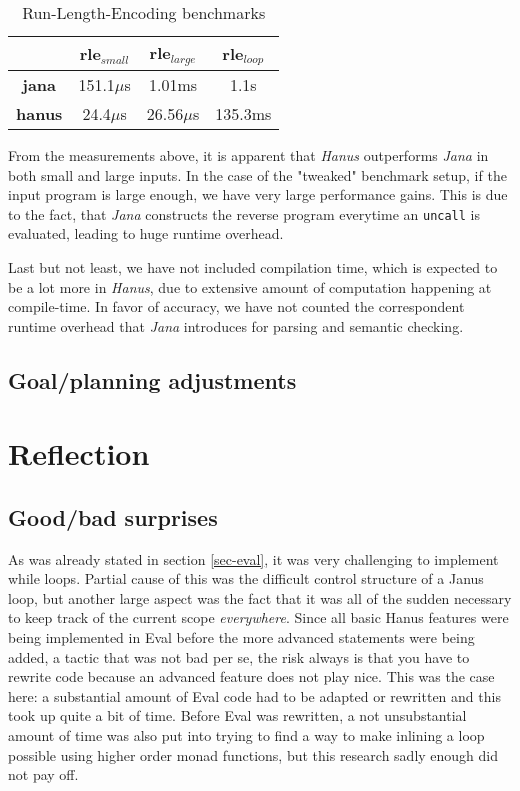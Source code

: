 \documentclass[12pt,a4paper]{article}
\newcommand{\inlinecode}[1]{\texttt{#1}}
\begin{document}
\begin{table}[h!]
\centering
\begin{tabular}{|c | c | c | c|}
\hline
& rle$_{small}$ & rle$_{large}$ & rle$_{loop}$ \\
\hline
\textbf{jana} & 151.1$\mu$s & 1.01ms & 1.1s \\
\textbf{hanus} & 24.4$\mu$s & 26.56$\mu$s & 135.3ms\\
\hline
\end{tabular}
\caption{Run-Length-Encoding benchmarks}
\end{table}

From the measurements above, it is apparent that \textit{Hanus} outperforms \textit{Jana} in both small and large inputs. In the case of the "tweaked" benchmark setup, if the input program is large enough, we have very large performance gains. This is due to the fact, that \textit{Jana} constructs the reverse program everytime an \inlinecode{uncall} is evaluated, leading to huge runtime overhead.

Last but not least, we have not included compilation time, which is expected to be a lot more in \textit{Hanus}, due to extensive amount of computation happening at compile-time. In favor of accuracy, we have not counted the correspondent runtime overhead that \textit{Jana} introduces for parsing and semantic checking.

    \subsection{Goal/planning adjustments}
\section{Reflection}
    \subsection{Good/bad surprises}
                As was already stated in section \ref{sec-eval}, it was very challenging to implement while loops. Partial cause of this was the difficult control structure of a Janus loop\cite{lutz82}, but another large aspect was the fact that it was all of the sudden necessary to keep track of the current scope \emph{everywhere}. Since all basic Hanus features were being implemented in Eval before the more advanced statements were being added, a tactic that was not bad per se, the risk always is that you have to rewrite code because an advanced feature does not play nice. This was the case here: a substantial amount of Eval code had to be adapted or rewritten and this took up quite a bit of time. Before Eval was rewritten, a not unsubstantial amount of time was also put into trying to find a way to make inlining a loop possible using higher order monad functions, but this research sadly enough did not pay off.
\end{document}
